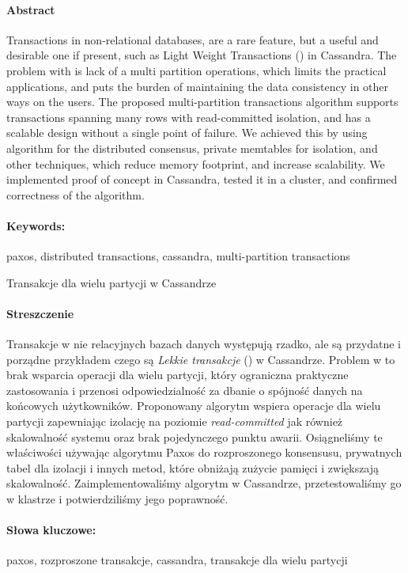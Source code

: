 \newpage
\paragraph{Abstract} 
Transactions in non-relational databases, are a rare feature, but a useful and desirable one if present, such as Light Weight Transactions (\lwt) in Cassandra.
The problem with \lwt is lack of a multi partition operations, which limits the practical applications, and puts the burden of maintaining the data consistency in other ways on the users.
The proposed multi-partition transactions algorithm supports transactions spanning many rows with read-committed isolation, and has a scalable design without a single point of failure.
We achieved this by using \paxos algorithm for the distributed consensus, private memtables for isolation, and other techniques, which reduce memory footprint, and increase scalability.
We implemented proof of concept in Cassandra, tested it in a cluster, and confirmed correctness of the algorithm.

\paragraph{Keywords:} paxos, distributed transactions, cassandra, multi-partition transactions

\begin{center}
    \fontsize{12pt}{14pt}\selectfont
      Transakcje dla wielu partycji w Cassandrze  \\
\end{center}
\paragraph{Streszczenie} 
Transakcje w nie relacyjnych bazach danych występują rzadko, ale są przydatne i porządne przykładem czego są \emph{Lekkie transakcje} (\lwt) w Cassandrze.
Problem w \lwt to brak wsparcia operacji dla wielu partycji, który ograniczna praktyczne zastosowania i przenosi odpowiedzialność za dbanie o spójność danych na końcowych użytkowników.
Proponowany algorytm wspiera operacje dla wielu partycji zapewniając izolację na poziomie \emph{read-committed} jak również skalowalność systemu oraz brak pojedynczego punktu awarii.
Osiągneliśmy te właściwości używając algorytmu Paxos do rozproszonego konsensusu, prywatnych tabel dla izolacji i innych metod, które obniżają zużycie pamięci i zwiększają skalowalność.
Zaimplementowaliśmy algorytm w Cassandrze, przetestowaliśmy go w klastrze i potwierdziliśmy jego poprawność.

\paragraph{Słowa kluczowe:} paxos, rozproszone transakcje, cassandra, transakcje dla wielu partycji

